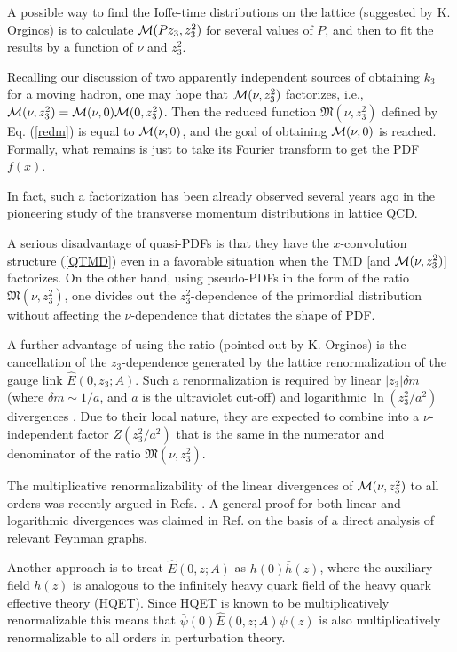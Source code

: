 A possible way to find the Ioffe-time distributions on the lattice
(suggested by K. Orginos) is to
calculate ${\cal M} (Pz_3, z_3^2)$ for several values of $P$,
and then to fit the results by a function of $\nu$ and $z_3^2$.

Recalling our discussion of two apparently independent
sources of obtaining $k_3$ for a moving hadron, one may hope
that
${\cal M} (\nu, z_3^2)$ factorizes, i.e.,
${\cal M} (\nu, z_3^2)= {\cal M} (\nu, 0) {\cal M} (0, z_3^2)$. Then
the reduced function ${\mathfrak M} (\nu, z_3^2) $ defined by Eq. (\ref{redm})
is equal to $ {\cal M} (\nu, 0)$,
and
the goal of obtaining ${\cal M} (\nu, 0)$ is reached.
Formally, what remains is just to take its Fourier transform to get the PDF $f(x)$.

In fact, such a factorization has been already observed
several years ago
in the pioneering study \cite{Musch:2010ka} of the
transverse momentum distributions in lattice QCD.

A serious disadvantage of quasi-PDFs is that they have the $x$-convolution
structure (\ref{QTMD}) even in a favorable situation when
the TMD [and ${\cal M} (\nu, z_3^2)$] factorizes.
On the other hand, using pseudo-PDFs in the form of
the ratio ${\mathfrak M} (\nu, z_3^2)$, one
divides out the $z_3^2$-dependence of the
primordial distribution without affecting the $\nu$-dependence
that dictates the shape of PDF.

A further advantage of using the ratio (pointed out by K. Orginos) is
the cancellation of the \mbox{$z_3$-dependence}
generated
by the lattice renormalization of
the gauge link ${ \hat E} (0,z_3; A)$.
Such a renormalization is required by
linear $|z_3| \delta m$ (where $\delta m \sim 1/a$, and $a$ is the ultraviolet cut-off)
and logarithmic $\ln (z_3^2/a^2)$ divergences \cite{Polyakov:1980ca,Dotsenko:1979wb}.
Due to their local nature, they are expected to
combine into a $\nu$-independent factor
$Z(z_3^2/a^2)$ that is the same in the numerator and denominator
of the ratio ${\mathfrak M} (\nu, z_3^2) $.

The multiplicative renormalizability of the linear
divergences of ${\cal M} (\nu, z_3^2)$
to all orders
was recently argued in Refs. \cite{Ishikawa:2016znu,Chen:2016fxx}.
A general proof for both linear and logarithmic divergences was claimed in
Ref. \cite{Ishikawa:2017faj}
on the basis of a direct analysis of relevant Feynman graphs.

Another approach \cite{Ji:2017oey,Green:2017xeu} is to treat
$ \hat E(0,z;A) $ as
$ h(0) \bar h (z) $,
where the auxiliary field $h(z)$ is analogous to the infinitely heavy
quark field of the heavy quark effective theory (HQET).
Since HQET is known to be multiplicatively renormalizable \cite{Bagan:1993zv}
this means that $\bar \psi(0)  \hat E(0,z;A) \psi (z)$ is also
multiplicatively renormalizable to all orders in perturbation theory.

